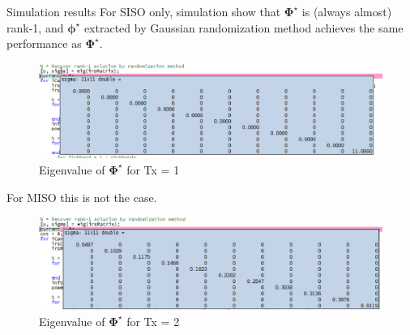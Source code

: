 \documentclass[9pt]{beamer}
\begin{document}
\begin{frame}{Simulation results}
    For SISO only, simulation show that $\boldsymbol{\Phi}^{\star}$ is (always almost) rank-1, and $\boldsymbol{\phi}^{\star}$ extracted by Gaussian randomization method achieves the same performance as $\boldsymbol{\Phi}^{\star}$.
    \begin{figure}
        \centering
        \includegraphics[width=0.8\linewidth]{assets/irs_matrix_tx_1.eps}
        \caption{Eigenvalue of $\boldsymbol{\Phi}^{\star}$ for Tx = 1}
    \end{figure}
    For MISO this is not the case.
    \begin{figure}
        \centering
        \includegraphics[width=0.8\linewidth]{assets/irs_matrix_tx_2.eps}
        \caption{Eigenvalue of $\boldsymbol{\Phi}^{\star}$ for Tx = 2}
    \end{figure}
\end{frame}
\end{document}
